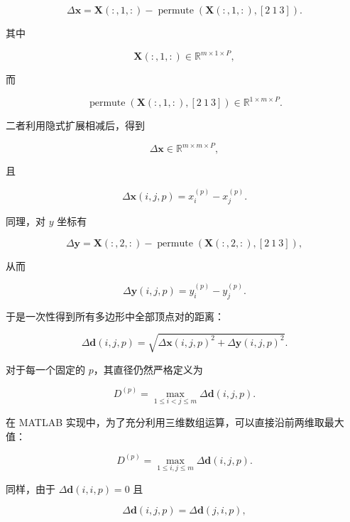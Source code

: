 \begin{equation}
\Delta\mathbf x =
\mathbf X(:,1,:) -
\operatorname{permute}
\left(
\mathbf X(:,1,:),
[2\ 1\ 3]
\right).
\end{equation}

其中

$$
\mathbf X(:,1,:)\in\mathbb R^{m\times1\times P},
$$

而

$$
\operatorname{permute}
\left(
\mathbf X(:,1,:),
[2\ 1\ 3]
\right)
\in\mathbb R^{1\times m\times P}.
$$

二者利用隐式扩展相减后，得到

$$
\Delta\mathbf x\in\mathbb R^{m\times m\times P},
$$

且

\begin{equation}
\Delta\mathbf x(i,j,p)
=
x_i^{(p)}-x_j^{(p)}.
\end{equation}

同理，对 $y$ 坐标有

\begin{equation}
\Delta\mathbf y =
\mathbf X(:,2,:) -
\operatorname{permute}
\left(
\mathbf X(:,2,:),
[2\ 1\ 3]
\right),
\end{equation}

从而

\begin{equation}
\Delta\mathbf y(i,j,p)
=
y_i^{(p)}-y_j^{(p)}.
\end{equation}

于是一次性得到所有多边形中全部顶点对的距离：

\begin{equation}
\Delta\mathbf d(i,j,p)
=
\sqrt{
\Delta\mathbf x(i,j,p)^2
+
\Delta\mathbf y(i,j,p)^2
}.
\end{equation}

对于每一个固定的 $p$，其直径仍然严格定义为

\begin{equation}
D^{(p)} =
\max_{1\leq i<j\leq m}
\Delta\mathbf d(i,j,p).
\end{equation}

在 MATLAB 实现中，为了充分利用三维数组运算，可以直接沿前两维取最大值：

\begin{equation}
D^{(p)} =
\max_{1\leq i,j\leq m}
\Delta\mathbf d(i,j,p).
\end{equation}

同样，由于 $\Delta\mathbf d(i,i,p)=0$ 且

$$
\Delta\mathbf d(i,j,p)
=
\Delta\mathbf d(j,i,p),
$$

